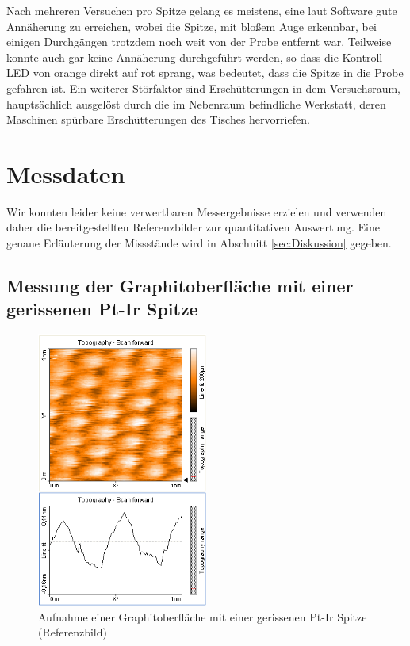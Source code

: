 \documentclass[10pt, a4paper]{article}
\begin{document}
Nach mehreren Versuchen pro Spitze gelang es meistens, eine laut Software gute Annäherung zu erreichen, wobei die Spitze, mit bloßem Auge erkennbar, bei einigen Durchgängen trotzdem noch weit von der Probe entfernt war.
Teilweise konnte auch gar keine Annäherung durchgeführt werden, so dass die Kontroll-LED von orange direkt auf rot sprang, was bedeutet, dass die Spitze in die Probe gefahren ist.
Ein weiterer Störfaktor sind Erschütterungen in dem Versuchsraum, hauptsächlich ausgelöst durch die im Nebenraum befindliche Werkstatt, deren Maschinen spürbare Erschütterungen des Tisches hervorriefen.

\section{Messdaten}
Wir konnten leider keine verwertbaren Messergebnisse erzielen und verwenden daher die bereitgestellten Referenzbilder zur quantitativen Auswertung.
Eine genaue Erläuterung der Missstände wird in Abschnitt \ref{sec:Diskussion} gegeben.

\subsection{Messung der Graphitoberfläche mit einer gerissenen Pt-Ir Spitze}
\begin{figure}[!h]
\centering
\includegraphics[width=0.5\textwidth]{./grafiken/originale/ref_graphit_pt_ir_1nm.png}
\caption{Aufnahme einer Graphitoberfläche mit einer gerissenen Pt-Ir Spitze (Referenzbild)}
\label{fig:ref_ptir}
\end{figure}
\end{document}
